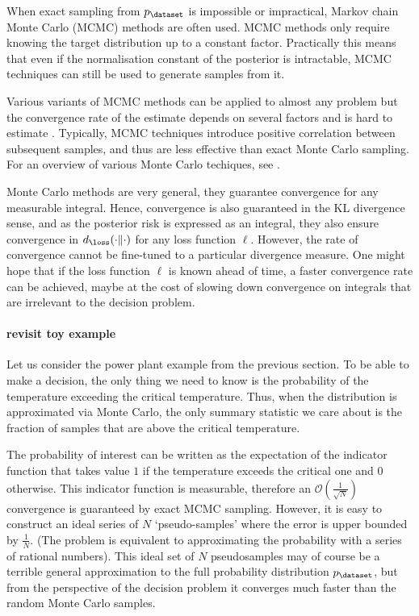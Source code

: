 When exact sampling from $p_\dataset$ is impossible or impractical, Markov chain Monte Carlo (MCMC) methods are often used. MCMC methods only require knowing the target distribution up to a constant factor. Practically this means that even if the normalisation constant of the posterior is intractable, MCMC techniques can still be used to generate samples from it.

Various variants of MCMC methods can be applied to almost any problem but the convergence rate of the estimate depends on several factors and is hard to estimate \citep{CowlesCarlin96}. Typically, MCMC techniques introduce positive correlation between subsequent samples, and thus are less effective than exact Monte Carlo sampling. For an overview of various Monte Carlo techiques, see \citep{Murray2007}.

Monte Carlo methods are very general, they guarantee convergence for any measurable integral. Hence, convergence is also guaranteed in the KL divergence sense, and as the posterior risk is expressed as an integral, they also ensure convergence in $d_\loss(\cdot\|\cdot)$ for any loss function $\ell$. However, the rate of convergence cannot be fine-tuned to a particular divergence measure. One might hope that if the loss function $\ell$ is known ahead of time, a faster convergence rate can be achieved, maybe at the cost of slowing down convergence on integrals that are irrelevant to the decision problem.

\paragraph{revisit toy example} Let us consider the power plant example from the previous section. To be able to make a decision, the only thing we need to know is the probability of the temperature exceeding the critical temperature. Thus, when the distribution is approximated via Monte Carlo, the only summary statistic we care about is the fraction of samples that are above the critical temperature.

The probability of interest can be written as the expectation of the indicator function that takes value $1$ if the temperature exceeds the critical one and $0$ otherwise. This indicator function is measurable, therefore an $\mathcal{O}(\frac{1}{\sqrt{N}})$ convergence is guaranteed by exact MCMC sampling.
However, it is easy to construct an ideal series of $N$ `pseudo-samples' where the error is upper bounded by $\frac{1}{N}$. (The problem is equivalent to approximating the probability with a series of rational numbers). This ideal set of $N$ pseudosamples may of course be a terrible general approximation to the full probability distribution $p_\dataset$, but from the perspective of the decision problem it converges much faster than the random Monte Carlo samples.

